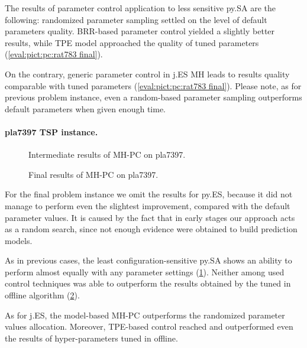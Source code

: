 The results of parameter control application to less sensitive py.SA are the following: randomized parameter sampling settled on the level of default parameters quality. BRR-based parameter control yielded a slightly better results, while TPE model approached the quality of tuned parameters (\cref{eval:pict:pc:rat783 final}).

On the contrary, generic parameter control in j.ES MH leads to results quality comparable  with tuned parameters (\cref{eval:pict:pc:rat783 final}). Please note, as for previous problem instance, even a random-based parameter sampling outperforms default parameters when given enough time.

\paragraph{pla7397 TSP instance.}
\begin{figure}[t]
	\centering
	\vspace{-20pt}
	
	\caption{Intermediate results of MH-PC on pla7397.}
	\vspace{-5pt}
	\label{eval:pict:pc:pla7397 intermediate}
\end{figure}

\begin{figure}[b]
	\centering
	\vspace{-20pt}
	
	\caption{Final results of MH-PC on pla7397.}
	\vspace{-5pt}
	\label{eval:pict:pc:pla7397 final}
\end{figure}

For the final problem instance we omit the results for py.ES, because it did not manage to perform even the slightest improvement, compared with the default parameter values. It is caused by the fact that in early stages our approach acts as a random search, since not enough evidence were obtained to build prediction models.

As in previous cases, the least configuration-sensitive py.SA shows an ability to perform almost equally with any parameter settings (\cref{eval:pict:pc:pla7397 intermediate}). Neither among used control techniques was able to outperform the results obtained by the tuned in offline algorithm (\cref{eval:pict:pc:pla7397 final}). 

As for j.ES, the model-based MH-PC outperforms the randomized parameter values allocation. Moreover, TPE-based control reached and outperformed even the results of hyper-parameters tuned in offline.

